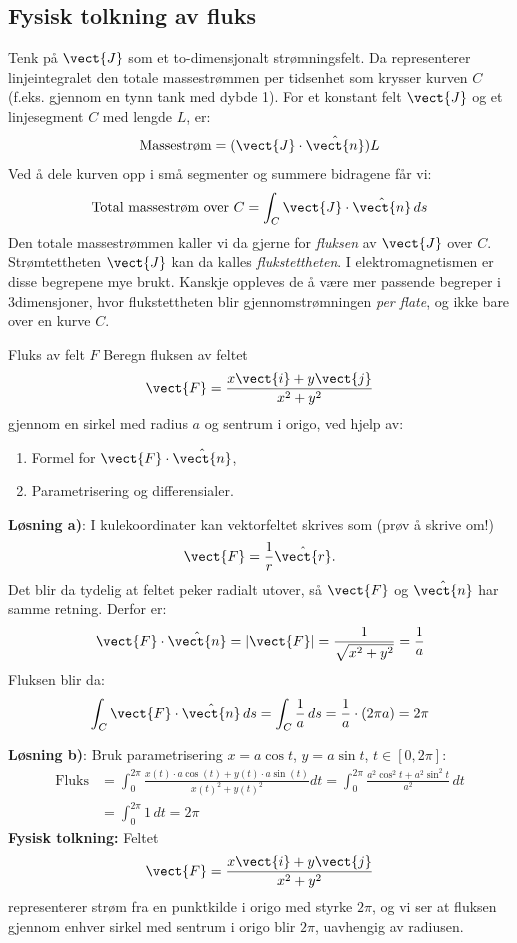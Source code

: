 \subsection*{Fysisk tolkning av fluks}
Tenk på $\vect{J}$ som et to-dimensjonalt strømningsfelt. Da representerer linjeintegralet den totale massestrømmen per tidsenhet som krysser kurven $C$ (f.eks. gjennom en tynn tank med dybde 1).
For et konstant felt $\vect{J}$ og et linjesegment $C$ med lengde $L$, er:
\[
\text{Massestrøm} = (\vect{J} \cdot \hat{\vect{n}})L
\]
Ved å dele kurven opp i små segmenter og summere bidragene får vi:
\[
\text{Total massestrøm over } C = \int_C \vect{J} \cdot \hat{\vect{n}} \, ds
\]
Den totale massestrømmen kaller vi da gjerne for \textit{fluksen} av $\vect{J}$ over $\textit{C}$. Strømtettheten $\vect{J}$ kan da kalles \textit{flukstettheten}. I elektromagnetismen er disse begrepene mye brukt. Kanskje oppleves de å være mer passende begreper i 3dimensjoner, hvor flukstettheten blir gjennomstrømningen \textit{per flate}, og ikke bare over en kurve $\textit{C}$.

\begin{eks}{Fluks av felt $F$}
Beregn fluksen av feltet 
\[
\vect{F} = \frac{x\vect{i} + y\vect{j}}{x^2 + y^2}
\]
gjennom en sirkel med radius $a$ og sentrum i origo, ved hjelp av:
\begin{enumerate}
\item Formel for $\vect{F} \cdot \hat{\vect{n}}$,
\item Parametrisering og differensialer.
\end{enumerate}

\textbf{Løsning a)}: I kulekoordinater kan vektorfeltet skrives som (prøv å skrive om!)
\[\vect{F}=\frac{1}{r}\hat{\vect{r}}.\]
Det blir da tydelig at feltet peker radialt utover, så $\vect{F}$ og $\hat{\vect{n}}$ har samme retning. Derfor er:
\[
\vect{F} \cdot \hat{\vect{n}} = |\vect{F}| = \frac{1}{\sqrt{x^2 + y^2}} = \frac{1}{a}
\]
Fluksen blir da:
\[
\int_C \vect{F} \cdot\hat{\vect{n}} \, ds = \int_C \frac{1}{a} \, ds = \frac{1}{a} \cdot (2\pi a) = 2\pi
\]

\textbf{Løsning b)}: Bruk parametrisering $x = a \cos t$, $y = a \sin t$, $t \in [0, 2\pi]$:
\begin{align*}
\text{Fluks} &= \int_0^{2\pi} \frac{x(t)\cdot a \cos(t) + y(t)\cdot a \sin(t) }{x(t)^2 + y(t)^2}  dt = \int_0^{2\pi} \frac{a^2 \cos^2 t + a^2 \sin^2 t}{a^2} \, dt \\ &= \int_0^{2\pi} 1 \, dt = 2\pi
\end{align*}
\textbf{Fysisk tolkning:}
Feltet 
\[
\vect{F} = \frac{x\vect{i} + y\vect{j}}{x^2 + y^2}
\]
representerer strøm fra en punktkilde i origo med styrke $2\pi$, og vi ser at fluksen gjennom enhver sirkel med sentrum i origo blir $2\pi$, uavhengig av radiusen.
\end{eks}



